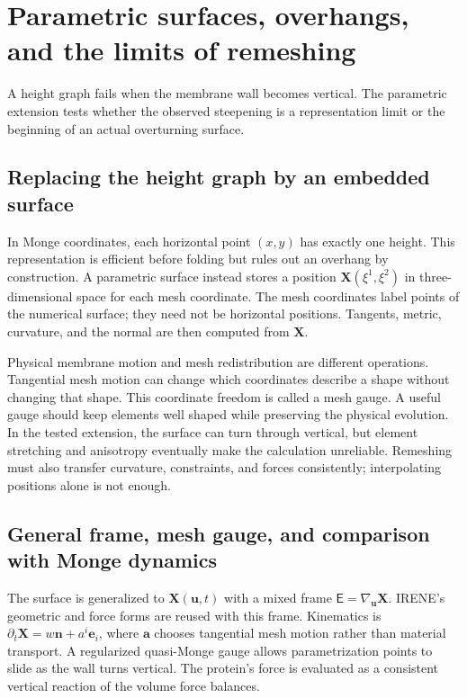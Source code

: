\section{Parametric surfaces, overhangs, and the limits of remeshing}\label{sec:fold}
A height graph fails when the membrane wall becomes vertical. The parametric extension tests whether the observed steepening is a representation limit or the beginning of an actual overturning surface.


\subsection{Replacing the height graph by an embedded surface}
In Monge coordinates, each horizontal point $(x,y)$ has exactly one height. This representation is efficient before folding but rules out an overhang by construction. A parametric surface instead stores a position $\bm X(\xi^1,\xi^2)$ in three-dimensional space for each mesh coordinate. The mesh coordinates label points of the numerical surface; they need not be horizontal positions. Tangents, metric, curvature, and the normal are then computed from $\bm X$.

Physical membrane motion and mesh redistribution are different operations. Tangential mesh motion can change which coordinates describe a shape without changing that shape. This coordinate freedom is called a mesh gauge. A useful gauge should keep elements well shaped while preserving the physical evolution. In the tested extension, the surface can turn through vertical, but element stretching and anisotropy eventually make the calculation unreliable. Remeshing must also transfer curvature, constraints, and forces consistently; interpolating positions alone is not enough.


\subsection{General frame, mesh gauge, and comparison with Monge dynamics}


The surface is generalized to $\bm X(\bm u,t)$ with a mixed frame $\mathsf E=\nabla_{\bm u}\bm X$. IRENE's geometric and force forms are reused with this frame. Kinematics is $\partial_t\bm X=w\bm n+a^i\bm e_i$, where $\bm a$ chooses tangential mesh motion rather than material transport. A regularized quasi-Monge gauge allows parametrization points to slide as the wall turns vertical. The protein's force is evaluated as a consistent vertical reaction of the volume force balances.

